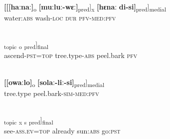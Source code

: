 \documentclass[output=paper]{LSP/langsci}
\begin{document}
\begin{exe}
\ex \label{Aiex:App25}
\gll \textbf{[[[haːnaː]}\textsubscript{o}	\textbf{[muːluː-wɛː]}\textsubscript{pred}]\textsubscript{x}	\textbf{[hɛnaː}	\textbf{di-si]}\textsubscript{pred}]\textsubscript{medial}\\
water:\textsc{abs}	wash-\textsc{loc}	\textsc{dur}	\textsc{pfv}-\textsc{med}:\textsc{pfv}\\
\glt {}\\
\end{exe}

\begin{exe}
\ex \label{Aiex:App26}	
\gll [[ɸiliː-nɛ:=jaː]\textsubscript{topic}	\underline{}\textsubscript{o}	\underline{\smash{[solaː}}	\underline{\smash{di]}}\textsubscript{pred}]\textsubscript{final}\\
ascend-\textsc{pst}=\textsc{top}	tree.type-\textsc{abs}	peel.bark	\textsc{pfv}\\
\glt {}\\
\end{exe}

	
\begin{exe}
\ex \label{Aiex:App27}	
\gll \textbf{[[owaːlo]}\textsubscript{o}	\textbf{[solaː-liː-si]}\textsubscript{pred}]\textsubscript{medial}\\
tree.type	peel.bark-\textsc{sim}-\textsc{med}:\textsc{pfv}\\
‎‎\glt {}\\
\end{exe}

\begin{exe}
\ex \label{Aiex:App28}
\gll [[bɛdaː-loːlu=waː]\textsubscript{topic}	\underline{\smash{[ɛimɛ]}}\textsubscript{x}	\underline{\smash{[oːɸaː]}}\textsubscript{s}	\underline{\smash{[aːnɛː]}}\textsubscript{pred}]\textsubscript{final}\\
see-\textsc{ass.ev}=\textsc{top}	already	sun:\textsc{abs}	go:\textsc{pst}\\
\glt {}\\
\end{exe}
\end{document}
